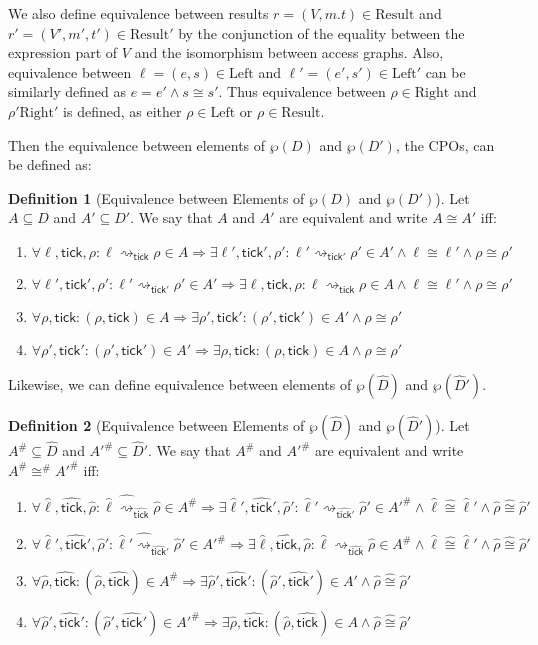 \documentclass{article}
\theoremstyle{definition}
\newtheorem{definition}{Definition}[section]
\newcommand*{\A}[1]{\widehat{#1}}
\newcommand*{\Abs}[1]{{#1}^{\#}}
\newcommand*{\Left}{\text{Left}}
\newcommand*{\Right}{\text{Right}}
\newcommand*{\mem}{m}
\newcommand*{\Result}{\text{Result}}
\newcommand*{\semarrow}{\rightsquigarrow}
\newcommand*{\tick}{\mathsf{tick}}
\begin{document}
We also define equivalence between results $r=(V,\mem.t)\in\Result$ and $r'=(V',\mem',t')\in\Result'$ by the conjunction of the equality between the expression part of $V$ and the isomorphism between access graphs.
Also, equivalence between $\ell=(e,s)\in\Left$ and $\ell'=(e',s')\in\Left'$ can be similarly defined as $e=e'\wedge s\cong s'$.
Thus equivalence between $\rho\in\Right$ and $\rho'\Right'$ is defined, as either $\rho\in\Left$ or $\rho\in\Result$.

Then the equivalence between elements of $\wp(D)$ and $\wp(D')$, the CPOs, can be defined as:
\begin{definition}[Equivalence between Elements of $\wp(D)$ and $\wp(D')$]
  Let $A\subseteq D$ and $A'\subseteq D'$. We say that $A$ and $A'$ are equivalent and write $A\cong A'$ iff:
  \begin{enumerate}
    \item $\forall\ell,\tick,\rho:\ell\semarrow_{\tick}\rho\in A\Rightarrow\exists\ell',\tick',\rho':\ell'\semarrow_{\tick'}\rho'\in A'\wedge\ell\cong\ell'\wedge\rho\cong\rho'$
    \item $\forall\ell',\tick',\rho':\ell'\semarrow_{\tick'}\rho'\in A'\Rightarrow\exists\ell,\tick,\rho:\ell\semarrow_{\tick}\rho\in A\wedge\ell\cong\ell'\wedge\rho\cong\rho'$
    \item $\forall\rho,\tick:(\rho,{\tick})\in A\Rightarrow\exists\rho',\tick':(\rho',{\tick'})\in A'\wedge\rho\cong\rho'$
    \item $\forall\rho',\tick':(\rho',{\tick'})\in A'\Rightarrow\exists\rho,\tick:(\rho,{\tick})\in A\wedge\rho\cong\rho'$
  \end{enumerate}
\end{definition}

Likewise, we can define equivalence between elements of $\wp(\A{D})$ and $\wp(\A{D}')$.
\begin{definition}[Equivalence between Elements of $\wp(\A{D})$ and $\wp(\A{D}')$]
  Let $\Abs{A}\subseteq \A{D}$ and $\Abs{A'}\subseteq \A{D}'$. We say that $\Abs{A}$ and $\Abs{A'}$ are equivalent and write $\Abs{A}\Abs\cong \Abs{A'}$ iff:
  \begin{enumerate}
    \item $\forall\A\ell,\A\tick,\A\rho:\A\ell\A\semarrow_{\A\tick}\A\rho\in \Abs{A}\Rightarrow\exists\A\ell',\A\tick',\A\rho':\A\ell'\semarrow_{\A\tick'}\A\rho'\in \Abs{A'}\wedge\A\ell\A\cong\A\ell'\wedge\A\rho\A\cong\A\rho'$
    \item $\forall\A\ell',\A\tick',\A\rho':\A\ell'\A\semarrow_{\A\tick'}\A\rho'\in \Abs{A'}\Rightarrow\exists\A\ell,\A\tick,\A\rho:\A\ell\semarrow_{\A\tick}\A\rho\in \Abs{A}\wedge\A\ell\A\cong\A\ell'\wedge\A\rho\A\cong\A\rho'$
    \item $\forall\A\rho,\A\tick:(\A\rho,\A{\tick})\in \Abs{A}\Rightarrow\exists\A\rho',\A\tick':(\A\rho',\A{\tick}')\in A'\wedge\A\rho\A\cong\A\rho'$
    \item $\forall\A\rho',\A\tick':(\A\rho',\A{\tick}')\in \Abs{A'}\Rightarrow\exists\A\rho,\A\tick:(\A\rho,\A{\tick})\in A\wedge\A\rho\A\cong\A\rho'$
  \end{enumerate}
\end{definition}
\end{document}
